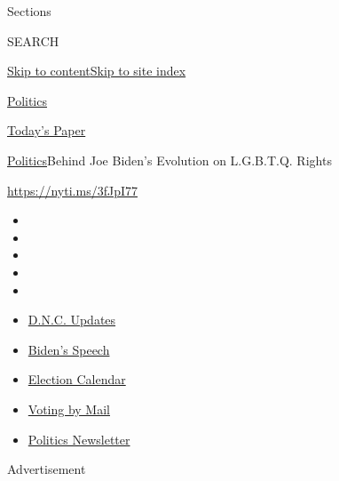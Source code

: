 Sections

SEARCH

\protect\hyperlink{site-content}{Skip to
content}\protect\hyperlink{site-index}{Skip to site index}

\href{https://www.nytimes3xbfgragh.onion/section/politics}{Politics}

\href{https://myaccount.nytimes3xbfgragh.onion/auth/login?response_type=cookie\&client_id=vi}{}

\href{https://www.nytimes3xbfgragh.onion/section/todayspaper}{Today's
Paper}

\href{/section/politics}{Politics}\textbar{}Behind Joe Biden's Evolution
on L.G.B.T.Q. Rights

\url{https://nyti.ms/3fJpI77}

\begin{itemize}
\item
\item
\item
\item
\item
\end{itemize}

\begin{itemize}
\item
  \href{https://www.nytimes3xbfgragh.onion/live/2020/08/20/us/dnc-convention-election?action=click\&pgtype=Article\&state=default\&region=TOP_BANNER\&context=storylines_menu}{D.N.C.
  Updates}
\item
  \href{https://www.nytimes3xbfgragh.onion/2020/08/20/us/politics/biden-presidential-nomination-dnc.html?action=click\&pgtype=Article\&state=default\&region=TOP_BANNER\&context=storylines_menu}{Biden's
  Speech}
\item
  \href{https://www.nytimes3xbfgragh.onion/interactive/2019/us/elections/2020-presidential-election-calendar.html?action=click\&pgtype=Article\&state=default\&region=TOP_BANNER\&context=storylines_menu}{Election
  Calendar}
\item
  \href{https://www.nytimes3xbfgragh.onion/interactive/2020/08/11/us/politics/vote-by-mail-us-states.html?action=click\&pgtype=Article\&state=default\&region=TOP_BANNER\&context=storylines_menu}{Voting
  by Mail}
\item
  \href{https://www.nytimes3xbfgragh.onion/newsletters/politics?action=click\&pgtype=Article\&state=default\&region=TOP_BANNER\&context=storylines_menu}{Politics
  Newsletter}
\end{itemize}

Advertisement

